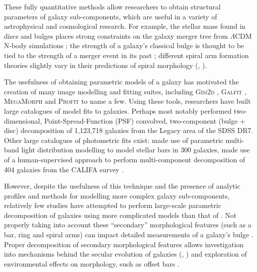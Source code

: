 \documentclass[../main.tex]{subfiles}
\begin{document}


These fully quantitative methods allow researchers to obtain structural parameters of galaxy sub-components, which are useful in a variety of astrophysical and cosmological research. For example, the stellar mass found in discs and bulges places strong constraints on the galaxy merger tree from $\Lambda\mathrm{CDM}$ N-body simulations \citep{Hopkins2010:1004.2708v3}; the strength of a galaxy's classical bulge is thought to be tied to the strength of a merger event in its past \citep{Kormendy2010:1009.3015v1}; different spiral arm formation theories slightly vary in their predictions of spiral morphology (\citealt{Dobbs2014:1407.5062v1}, \citealt{Pour-Imani2016:1608.00969v1} \citealt{2017MNRAS.472.2263H}).

The usefulness of obtaining parametric models of a galaxy has motivated the creation of many image modelling and fitting suites, including \textsc{Gim2d} \citep{gim2d-paper}, \textsc{Galfit} \citep{galfit-paper}, \textsc{MegaMorph} \citep{megamorph-paper} and \textsc{Profit} \citep{profit-paper} to name a few. Using these tools, researchers have built large catalogues of model fits to galaxies. Perhaps most notably \citet{Simard2011:1107.1518v1} performed two-dimensional, Point-Spread-Function (PSF) convolved, two-component (bulge + disc) decomposition of 1,123,718 galaxies from the Legacy area of the SDSS DR7. Other large catalogues of photometric fits exist: \cite{Gadotti2010:1003.1719v2} made use of parametric multi-band light distribution modelling to model stellar bars in 300 galaxies, \cite{Mendez-Abreu2016:1610.05324v1} made use of a human-supervised approach to perform multi-component decomposition of 404 galaxies from the CALIFA survey \citep{Sanchez2011:1111.0962v2}.

However, despite the usefulness of this technique and the presence of analytic profiles and methods for modelling more complex galaxy sub-components, relatively few studies have attempted to perform large-scale parametric decomposition of galaxies using more complicated models than that of \citet{Simard2011:1107.1518v1}. Not properly taking into account these ``secondary'' morphological features (such as a bar, ring and spiral arms) can impact detailed measurements of a galaxy's bulge \citep{Gao2017:1709.00746v1}. Proper decomposition of secondary morphological features allows investigation into mechanisms behind the secular evolution of galaxies (\citealt{2018MNRAS.473.4731K}, \citealt{2018ApJ...862..100G}) and exploration of environmental effects on morphology, such as offset bars \citep{2017MNRAS.469.3363K}.
\end{document}
